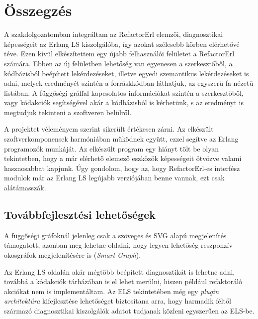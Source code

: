 \chapter{Összegzés}
\label{ch:sum}


A szakdolgozatomban integráltam az RefactorErl elemzői, diagnosztikai képességeit az Erlang LS kiszolgálóba, így azokat szélesebb körben elérhetővé téve. Ezen kívül elkészítettem egy újabb felhasználói felületet a RefactorErl számára. Ebben az új felületben lehetőség van egyenesen a szerkesztőből, a kódbázisból beépített lekérdezéseket, illetve egyedi szemantikus lekérdezéseket is adni, melyek eredményét szintén a forráskkódban láthatjuk, az egyszerű fa nézetű listában. A függőségi gráffal kapcsolatos információkat szintén a szerkesztőből, vagy kódakciók segítségével akár a kódbázisból is kérhetünk, s az eredményt is megtudjuk tekinteni a szoftveren belülről.


A projektet véleményem szerint sikerült értékesen zárni. Az elkészült szoftverkomponensek harmóniában működnek együtt, ezzel segítve az Erlang programozók munkáját. Az elkészült program egy hiányt tölt be olyan tekintetben, hogy a már elérhető elemező eszközök képességeit ötvözve valami hasznosabbat kapjunk. Úgy gondolom, hogy az, hogy RefactorErl-es interfész modulok már az Erlang LS legújabb verziójában benne vannak, ezt csak alátámasszák.

\section{Továbbfejlesztési lehetőségek}

A függőségi gráfoknál jelenleg csak a szöveges és SVG alapú megjelenítés támogatott, azonban meg lehetne oldalni, hogy legyen lehetőség reszponzív okosgráfok megjelenítésére is (\textit{Smart Graph}). 

Az Erlang LS oldalán akár mégtöbb beépített diagnosztikát is lehetne adni, továbbá a kódakciók tárházában is el lehet merülni, hiszen például refaktoráló akciókat nem is implementáltam. Az ELS tekintetében még egy \textit{plugin architektúra} kifejlesztése lehetőséget biztosítana arra, hogy harmadik féltől származó diagnosztikai kiszolgálók adatot tudjanak közleni egyszerűen az ELS-be. 